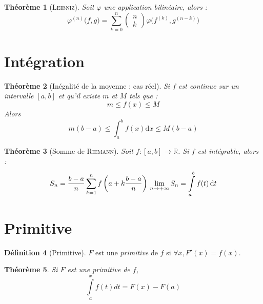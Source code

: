 \documentclass[11pt,a4paper]{report}
\newtheorem{theorem}{Théorème}[chapter]
\newtheorem{itheorem}[theorem]{Théorème}
\theoremstyle{definition}
\newtheorem{dfn}[theorem]{Définition}
\begin{document}
\begin{theorem}[\textsc{Leibniz}]
Soit $\varphi$ une application bilinéaire, alors :
\begin{equation}\tag{Leibniz}\label{Leibniz}
\varphi^{(n)}\big( f,g \big) = \sum_{k=0}^n \begin{pmatrix} n \\ k \end{pmatrix} \varphi \big( f^{(k)},g^{(n-k)} \big)
\end{equation}
\end{theorem}
\section{Intégration}
\begin{itheorem}[Inégalité de la moyenne : cas réel]
    Si $f$ est \emph{continue} sur un intervalle $[a,b]$ et qu'il existe $m$ et $M$ tels que : 
    \[
        m \le f(x) \le M
    \]
    Alors 
    \begin{equation}\label{eq:inegalite_de_la_moyenne}
    m(b-a) \le \int_a^b f(x) \mathrm{d}x \le M(b-a)
    \end{equation}
\end{itheorem}
\begin{itheorem}[Somme de \textsc{Riemann}]
Soit $f:[a,b]\longrightarrow \ensuremath{\mathbb{R}}$. Si $f$ est intégrable, alors : 
     \begin{equation}
     S_n=\frac{b-a}{n}\sum_{k=1}^n f\left(a + k\frac{b-a}n\right) \\ \lim_{n\to +\infty} S_n = \int\limits_a^b f(t) \,\mathrm{d} t
     \end{equation}
     
\end{itheorem}
\section{Primitive}
\begin{dfn}[Primitive]
$F$ est une \emph{primitive} de $f$ si $\forall x, F'(x)=f(x)$. 
\end{dfn}
\begin{theorem}
Si $F$ est une primitive de $f$,
\begin{equation}
    \int \limits_a^x f(t) dt = F(x) - F(a)
\end{equation}
\end{theorem}
\end{document}
